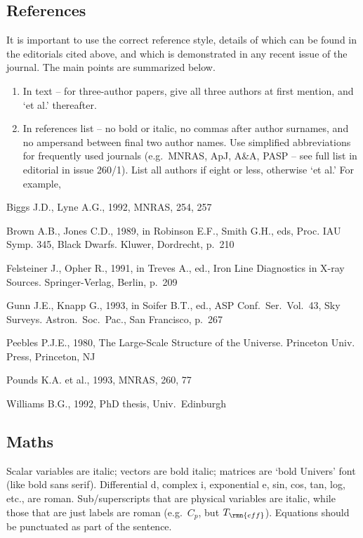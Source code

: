         
\subsection{References}

It  is important to use the correct reference style,  details  of 
which  can be found in the editorials cited above, and  which  is 
demonstrated in any recent issue of the journal. The main  points 
are summarized below.
%        
\begin{enumerate}
\item In text -- for three-author papers, give all three  authors 
at first mention, and `et al.' thereafter.

\item In references list -- no bold or italic, no  commas  after 
author surnames, and no ampersand between final two author names.
Use  simplified abbreviations for frequently used journals  (e.g.\ 
MNRAS,  ApJ,  A\&A, PASP -- see full list in  editorial  in  issue 
260/1). List all authors if eight or less, otherwise `et al.' For 
example,
\end{enumerate}        

\begin{thebiblio}{}%
\bibitem{} Biggs J.D., Lyne A.G., 1992, MNRAS, 254, 257

\bibitem{} Brown A.B., Jones C.D., 1989, in Robinson E.F., 
Smith G.H.,  eds, Proc. IAU Symp. 345, Black Dwarfs. Kluwer, Dordrecht, 
p.~210

\bibitem{} Felsteiner  J.,  Opher  R., 1991, in Treves A.,  ed.,  
Iron  Line Diagnostics in X-ray Sources. Springer-Verlag, Berlin, p.~209

\bibitem{} Gunn  J.E., Knapp G., 1993, in Soifer B.T., ed., ASP  
Conf.\ Ser.\ Vol.~43, Sky Surveys. Astron.\ Soc.\ Pac., San Francisco, p.~267

\bibitem{} Peebles P.J.E., 1980, The Large-Scale Structure of the  Universe. Princeton Univ. Press, Princeton, NJ 

\bibitem{} Pounds K.A. et al., 1993, MNRAS, 260, 77

\bibitem{} Williams B.G., 1992, PhD thesis, Univ.\ Edinburgh 
\end{thebiblio}

\subsection{Maths}
Scalar  variables are italic; vectors are bold  italic;  matrices 
are  `bold Univers' font (like bold sans serif). Differential  d, 
complex  i, exponential e, sin, cos, tan, log, etc.,  are  roman. 
Sub/superscripts  that are physical variables are  italic,  while 
those  that are just labels are roman (e.g.\ $C_p$, but $T_{\rmn{eff}}$).
Equations should be punctuated as part of the sentence.
        
